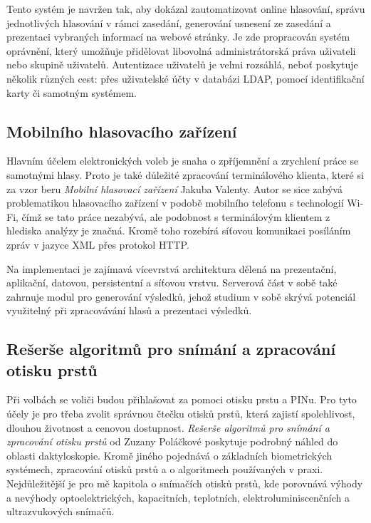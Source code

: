 \documentclass[11pt,twoside,a4paper]{book}
\begin{document}
Tento systém je navržen tak, aby dokázal zautomatizovat online hlasování, správu jednotlivých hlasování v rámci zasedání, generování usnesení ze zasedání a prezentaci vybraných informací na webové stránky. Je zde propracován systém oprávnění, který umožňuje přidělovat libovolná administrátorská práva uživateli nebo skupině uživatelů. Autentizace uživatelů je velmi rozsáhlá, neboť poskytuje několik různých cest: přes uživatelské účty v databázi LDAP, pomocí identifikační karty či samotným systémem. 

\subsection{Mobilního hlasovacího zařízení}

Hlavním účelem elektronických voleb je snaha o zpříjemnění a zrychlení práce se samotnými hlasy. Proto je také důležité zpracování terminálového klienta, které si za vzor beru \textit{Mobilní hlasovací zařízení} \cite{art:valenta} Jakuba Valenty. Autor se sice zabývá problematikou hlasovacího zařízení v podobě mobilního telefonu s technologií Wi-Fi, čímž se tato práce nezabývá, ale podobnost s terminálovým klientem z hlediska analýzy je značná. Kromě toho rozebírá síťovou komunikaci posíláním zpráv v jazyce XML přes protokol HTTP.

Na implementaci je zajímavá vícevrstvá architektura dělená na prezentační, aplikační, datovou, persistentní a síťovou vrstvu. Serverová část v sobě také zahrnuje modul pro generování výsledků, jehož studium v sobě skrývá potenciál využitelný při zpracovávání hlasů a prezentaci výsledků. 

\subsection{Rešerše algoritmů pro snímání a zpracování otisku prstů} \label{sec:reserse_otisky}

Při volbách se voliči budou přihlašovat za pomoci otisku prstu a PINu. Pro tyto účely je pro třeba zvolit správnou čtečku otisků prstů, která zajistí spolehlivost, dlouhou životnost a cenovou dostupnost. \textit{Rešerše algoritmů pro snímání a zpracování otisku prstů} \cite{art:polackova} od Zuzany Poláčkové poskytuje podrobný náhled do oblasti daktyloskopie. Kromě jiného pojednává o základních biometrických systémech, zpracování otisků prstů a o algoritmech používaných v praxi. Nejdůležitější je pro mě kapitola o snímačích otisků prstů, kde porovnává výhody a nevýhody optoelektrických, kapacitních, teplotních, elektroluminiscenčních a ultrazvukových snímačů.
\end{document}
